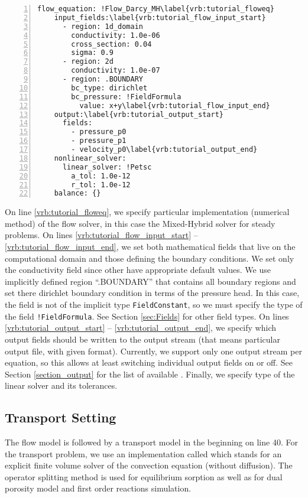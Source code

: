 \begin{Verbatim}[numbers=left, firstnumber=last,commandchars=\\\{\}]
  flow_equation: !Flow_Darcy_MH\label{vrb:tutorial_floweq}
    input_fields:\label{vrb:tutorial_flow_input_start}
      - region: 1d_domain
        conductivity: 1.0e-06
        cross_section: 0.04
        sigma: 0.9
      - region: 2d
        conductivity: 1.0e-07
      - region: .BOUNDARY
        bc_type: dirichlet
        bc_pressure: !FieldFormula
          value: x+y\label{vrb:tutorial_flow_input_end}
    output:\label{vrb:tutorial_output_start}
      fields:
        - pressure_p0
        - pressure_p1
        - velocity_p0\label{vrb:tutorial_output_end}
    nonlinear_solver:
      linear_solver: !Petsc
        a_tol: 1.0e-12
        r_tol: 1.0e-12
    balance: {}
\end{Verbatim}
On line \ref{vrb:tutorial_floweq}, we specify particular implementation (numerical method) of the flow solver, in this case the Mixed-Hybrid
solver for steady problems. On lines \ref{vrb:tutorial_flow_input_start} -- \ref{vrb:tutorial_flow_input_end}, we set both mathematical fields that live on the computational domain 
and those defining the boundary conditions. We set only the conductivity field since other  have appropriate default values.
We use implicitly defined region ``.BOUNDARY'' that contains all boundary regions and set there dirichlet boundary condition in terms of the 
pressure head. In this case, the field is not of the implicit type {\tt FieldConstant}, so we must specify the type of the field {\tt !FieldFormula}.
See Section \ref{sec:Fields} for other field types. 
On lines \ref{vrb:tutorial_output_start} -- \ref{vrb:tutorial_output_end}, we specify which output fields should be written to the output stream (that means particular output file, with given format).
Currently, we support only one output stream per equation, so this allows at least switching individual output fields on or off. 
See Section \ref{section_output} for the list of available .
Finally, we specify type of the linear solver and its tolerances.



\subsection{Transport Setting}
The flow model is followed by a transport model in the 
beginning on line 40. For the transport problem, we use an implementation called 
which stands for an explicit finite volume solver of the convection equation (without diffusion).
The operator splitting method is used for equilibrium sorption as well as for dual porosity model and 
first order reactions simulation.

